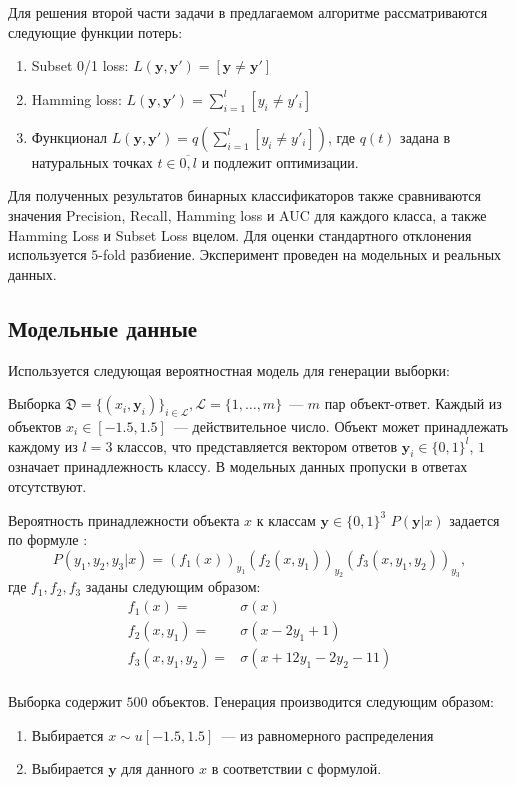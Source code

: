 \documentclass{ITaSconf}
\newcommand{\y}{\mathbf{y}}
\begin{document}
Для решения второй части задачи в предлагаемом алгоритме рассматриваются следующие функции потерь:
\begin{enumerate}
	\item Subset 0/1 loss: $L(\y, \y')=[\y\neq \y']$
	\item Hamming loss: $L(\y,\y')=\sum\limits_{i=1}^l[y_i\neq y'_i]$
	\item Функционал $L(\y,\y')=q\left(\sum\limits_{i=1}^l[y_i\neq y'_i]\right)$, где $q(t)$ задана в натуральных точках $t\in\overline{0,l}$ и подлежит оптимизации.
\end{enumerate}

Для полученных результатов бинарных классификаторов также сравниваются значения Precision, Recall, Hamming loss и AUC для каждого класса, а также Hamming Loss и Subset Loss вцелом. Для оценки стандартного отклонения используется $5$-fold разбиение. Эксперимент проведен на модельных и реальных данных.

\subsection{Модельные данные}
Используется следующая вероятностная модель для генерации выборки:

Выборка $\mathfrak{D}=\{(x_i,\y_i)\}_{i\in \mathcal{L}}, \mathcal{L}=\{1,\dots, m\}$~--- $m$ пар объект-ответ. Каждый из объектов $x_i\in [-1.5,1.5]$~--- действительное число. Объект может принадлежать каждому из $l=3$ классов, что представляется вектором ответов $\y_i\in \{0,1\}^l$, $1$ означает принадлежность классу. В модельных данных пропуски в ответах отсутствуют.

Вероятность принадлежности объекта $x$ к классам $\y\in\{0,1\}^3$ $P(\y|x)$ задается по формуле \cite{weiwei2010}:
$$P(y_1,y_2,y_3|x)=(f_1(x))_{y_1}(f_2(x, y_1))_{y_2}(f_3(x, y_1, y_2))_{y_3},$$
где $f_1,f_2,f_3$ заданы следующим образом:
$$
\begin{array}{rl}
f_1(x)= & \sigma(x)\\
f_2(x, y_1) =& \sigma(x-2y_1+1)\\
f_3(x, y_1, y_2) =& \sigma(x+12y_1-2y_2-11)\\
\end{array}
$$

Выборка содержит $500$ объектов. Генерация производится следующим образом:
\begin{enumerate}
	\item Выбирается $x\sim u[-1.5,1.5]$~--- из равномерного распределения
	\item Выбирается $\y$ для данного $x$ в соответствии с формулой.
\end{enumerate}
\end{document}
